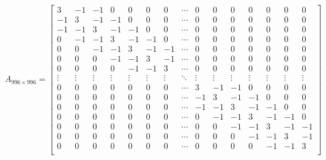 \usepackage{amsmath}
\[
A_{996\times996}=\begin{bmatrix}
3& -1& -1& 0& 0& 0& 0& \cdots & 0& 0& 0& 0& 0& 0& 0 \\
-1& 3& -1& -1& 0& 0& 0& \cdots & 0& 0& 0& 0& 0& 0& 0 \\
-1& -1& 3& -1& -1& 0& 0& \cdots & 0& 0& 0& 0& 0& 0& 0 \\
0& -1& -1& 3& -1& -1& 0& \cdots & 0& 0& 0& 0& 0& 0& 0 \\
0& 0& -1& -1& 3& -1& -1& \cdots & 0& 0& 0& 0& 0& 0& 0 \\
0& 0& 0& -1& -1& 3& -1& \cdots & 0& 0& 0& 0& 0& 0& 0 \\
0& 0& 0& 0& -1& -1& 3& \cdots & 0& 0& 0& 0& 0& 0& 0 \\
\vdots & \vdots & \vdots & \vdots & \vdots & \vdots & \vdots & \ddots & \vdots & \vdots & \vdots & \vdots & \vdots & \vdots & \vdots \\
0& 0& 0& 0& 0& 0& 0& \cdots & 3& -1& -1& 0& 0& 0& 0 \\
0& 0& 0& 0& 0& 0& 0& \cdots & -1& 3& -1& -1& 0& 0& 0 \\
0& 0& 0& 0& 0& 0& 0& \cdots & -1& -1& 3& -1& -1& 0& 0 \\
0& 0& 0& 0& 0& 0& 0& \cdots & 0& -1& -1& 3& -1& -1& 0 \\
0& 0& 0& 0& 0& 0& 0& \cdots & 0& 0& -1& -1& 3& -1& -1 \\
0& 0& 0& 0& 0& 0& 0& \cdots & 0& 0& 0& -1& -1& 3& -1 \\
0& 0& 0& 0& 0& 0& 0& \cdots & 0& 0& 0& 0& -1& -1& 3 \\
\end{bmatrix}
\]